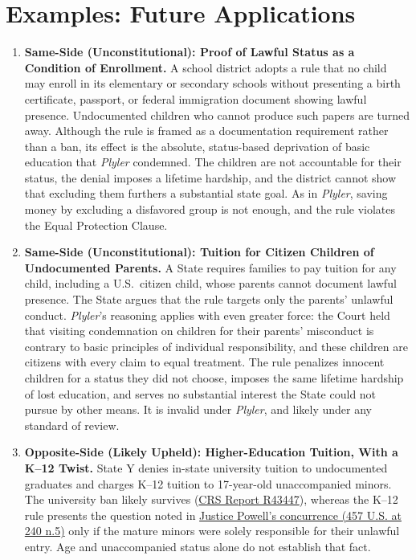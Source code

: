 \documentclass[12pt]{article}
\begin{document}
\section{Examples: Future Applications}
\begin{enumerate}

\item \textbf{Same-Side (Unconstitutional): Proof of Lawful Status as a Condition of Enrollment.} A school district adopts a rule that no child may enroll in its elementary or secondary schools without presenting a birth certificate, passport, or federal immigration document showing lawful presence. Undocumented children who cannot produce such papers are turned away. Although the rule is framed as a documentation requirement rather than a ban, its effect is the absolute, status-based deprivation of basic education that \textit{Plyler} condemned. The children are not accountable for their status, the denial imposes a lifetime hardship, and the district cannot show that excluding them furthers a substantial state goal. As in \textit{Plyler}, saving money by excluding a disfavored group is not enough, and the rule violates the Equal Protection Clause.

\item \textbf{Same-Side (Unconstitutional): Tuition for Citizen Children of Undocumented Parents.} A State requires families to pay tuition for any child, including a U.S.\ citizen child, whose parents cannot document lawful presence. The State argues that the rule targets only the parents' unlawful conduct. \textit{Plyler}'s reasoning applies with even greater force: the Court held that visiting condemnation on children for their parents' misconduct is contrary to basic principles of individual responsibility, and these children are citizens with every claim to equal treatment. The rule penalizes innocent children for a status they did not choose, imposes the same lifetime hardship of lost education, and serves no substantial interest the State could not pursue by other means. It is invalid under \textit{Plyler}, and likely under any standard of review.

\item \textbf{Opposite-Side (Likely Upheld): Higher-Education Tuition, With a K--12 Twist.} State Y denies in-state university tuition to undocumented graduates and charges K--12 tuition to 17-year-old unaccompanied minors. The university ban likely survives (\href{https://www.everycrsreport.com/reports/R43447.html}{CRS Report R43447}), whereas the K--12 rule presents the question noted in \href{https://www.law.cornell.edu/supremecourt/text/457/202}{Justice Powell's concurrence (457 U.S. at 240 n.5)} only if the mature minors were solely responsible for their unlawful entry. Age and unaccompanied status alone do not establish that fact.


\end{enumerate}
\end{document}

